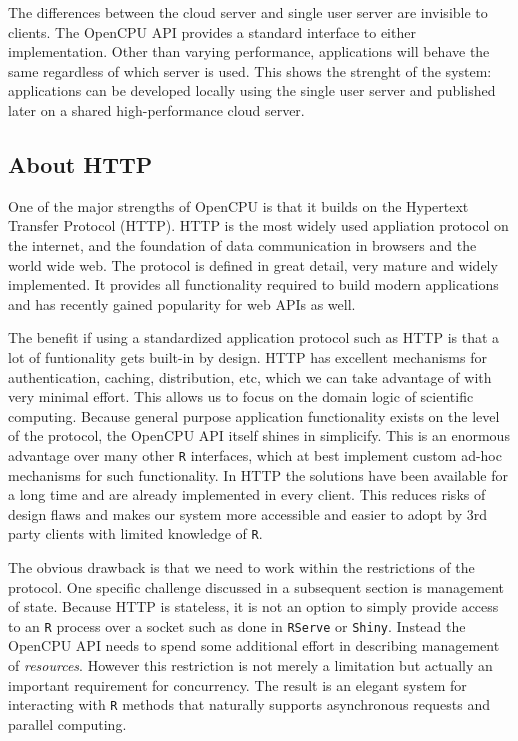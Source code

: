 \documentclass{article}
\newcommand{\R}{\texttt{R}\xspace}
\begin{document}
The differences between the cloud server and single user server are invisible to clients. The OpenCPU API provides a standard interface to either implementation. Other than varying performance, applications will behave the same regardless of which server is used. This shows the strenght of the system: applications can be developed locally using the single user server and published later on a shared high-performance cloud server.

\subsection{About HTTP}

One of the major strengths of OpenCPU is that it builds on the Hypertext Transfer Protocol (HTTP). HTTP is the most widely used appliation protocol on the internet, and the foundation of data communication in browsers and the world wide web. The protocol is defined in great detail, very mature and widely implemented. It provides all functionality required to build modern applications and has recently gained popularity for web APIs as well. 

The benefit if using a standardized application protocol such as HTTP is that a lot of funtionality gets built-in by design. HTTP has excellent mechanisms for authentication, caching, distribution, etc, which we can take advantage of with very minimal effort. This allows us to focus on the domain logic of scientific computing. Because general purpose application functionality exists on the level of the protocol, the OpenCPU API itself shines in simplicify. This is an enormous advantage over many other \R interfaces, which at best implement custom ad-hoc mechanisms for such functionality. In HTTP the solutions have been available for a long time and are already implemented in every client. This reduces risks of design flaws and makes our system more accessible and easier to adopt by 3rd party clients with limited knowledge of \R.

The obvious drawback is that we need to work within the restrictions of the protocol. One specific challenge discussed in a subsequent section is management of state. Because HTTP is stateless, it is not an option to simply provide access to an \R process over a socket such as done in \texttt{RServe} or \texttt{Shiny}. Instead the OpenCPU API needs to spend some additional effort in describing management of \emph{resources}. However this restriction is not merely a limitation but actually an important requirement for concurrency. The result is an elegant system for interacting with \R methods that naturally supports asynchronous requests and parallel computing. 
\end{document}
